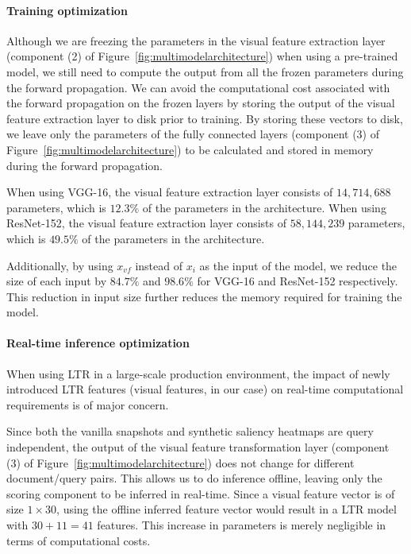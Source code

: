 \paragraph{Training optimization} 
Although we are freezing the parameters in the visual feature extraction layer (component (2) of Figure~\ref{fig:multimodelarchitecture}) when using a pre-trained model, we still need to compute the output from all the frozen parameters during the forward propagation.
We can avoid the computational cost associated with the forward propagation on the frozen layers by storing the output of the visual feature extraction layer to disk prior to training.
By storing these vectors to disk, we leave only the parameters of the fully connected layers (component (3) of Figure~\ref{fig:multimodelarchitecture}) to be calculated and stored in memory during the forward propagation. 


When using VGG-16, the visual feature extraction layer consists of $14,714,688$ parameters, which is $12.3\%$ of the parameters in the \modelname{} architecture. When using ResNet-152, the visual feature extraction layer consists of $58,144,239$ parameters, which is $49.5\%$ of the parameters in the \modelname{} architecture.

Additionally, by using $x_{vf}$ instead of $x_{i}$ as the input of the model, we reduce the size of each input by $84.7\%$ and $98.6\%$ for VGG-16 and ResNet-152 respectively. This reduction in input size further reduces the memory required for training the model.

\paragraph{Real-time inference optimization}
When using \ac{LTR} in a large-scale production environment, the impact of newly introduced \ac{LTR} features (visual features, in our case) on real-time computational requirements is of major concern.

Since both the vanilla snapshots and synthetic saliency heat\-maps are query independent, the output of the visual feature transformation layer (component (3) of Figure~\ref{fig:multimodelarchitecture}) does not change for different document/query pairs. This allows us to do inference offline, leaving only the scoring component to be inferred in real-time.
Since a visual feature vector is of size $1\times30$, using the offline inferred feature vector would result in a \ac{LTR} model with $30 + 11 = 41$ features. This increase in parameters is merely negligible in terms of computational costs.


